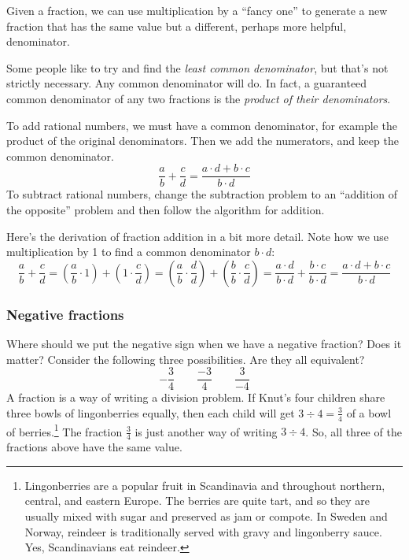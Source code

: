 Given a fraction, we can use multiplication by a ``fancy one'' to generate a new fraction that has the same value but a different, perhaps more helpful, denominator.

Some people like to try and find the \textit{least common denominator}, but that's not strictly necessary. Any common denominator will do. In fact, a guaranteed common denominator of any two fractions is the \textit{product of their denominators}.

\begin{boxdef}
To add rational numbers, we must have a common denominator, for example the product of the original denominators. Then we add the numerators, and keep the common denominator.
\[\frac{a}{b} + \frac{c}{d}
= \frac{a\cdot d + b\cdot c}{b\cdot d}\]
To subtract rational numbers, change the subtraction problem to an ``addition of the opposite'' problem and then follow the algorithm for addition.

Here's the derivation of fraction addition in a bit more detail. Note how we use multiplication by 1 to find a common denominator $b \cdot d$:
\[\frac{a}{b} + \frac{c}{d}
= \left( \frac{a}{b}\cdot 1 \right) + \left( 1\cdot\frac{c}{d} \right)
= \left( \frac{a}{b}\cdot\frac{d}{d} \right) + \left( \frac{b}{b}\cdot\frac{c}{d} \right)
= \frac{a\cdot d}{b\cdot d} + \frac{b\cdot c}{b\cdot d}
= \frac{a\cdot d + b\cdot c}{b\cdot d}\]

\end{boxdef}

\subsubsection{Negative fractions}

Where should we put the negative sign when we have a negative fraction? Does it matter? Consider the following three possibilities. Are they all equivalent?
\[ -\frac{3}{4} \qquad \frac{-3}{4} \qquad \frac{3}{-4}\]
A fraction is a way of writing a division problem. If Knut's four children share three bowls of lingonberries equally, then each child will get $3\div4 = \frac{3}{4}$ of a bowl of berries.\footnote{Lingonberries are a popular fruit in Scandinavia and throughout northern, central, and eastern Europe. The berries are quite tart, and so they are usually mixed with sugar and preserved as jam or compote. In Sweden and Norway, reindeer is traditionally served with gravy and lingonberry sauce. Yes, Scandinavians eat reindeer.} The fraction $\frac{3}{4}$ is just another way of writing $3 \div 4$. So, all three of the fractions above have the same value.

